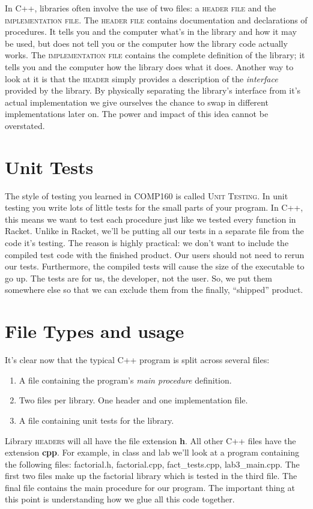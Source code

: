 \documentclass[]{tufte-handout}
\begin{document}
In C++, libraries often involve the use of two files: a \textsc{header file} and the \textsc{implementation file}. The \textsc{header file} contains documentation and declarations of procedures.  It tells you and the computer what's in the library and how it may be used, but does not tell you or the computer how the library code actually works.  The \textsc{implementation file} contains the complete definition of the library; it tells you and the computer how the library does what it does.  Another way to look at it is that the \textsc{header} simply provides a description of the \textit{interface} provided by the library.  By physically separating the library's interface from it's actual implementation we give ourselves the chance to swap in different implementations later on.  The power and impact of this idea cannot be overstated.  

\section{Unit Tests}

The style of testing you learned in COMP160 is called \textsc{Unit Testing}. In unit testing you write lots of little tests for the small parts of your program.  In C++, this means we want to test each procedure just like we tested every function in Racket.  Unlike in Racket, we'll be putting all our tests in a separate file from the code it's testing.  The reason is highly practical: we don't want to include the compiled test code with the finished product. Our users should not need to rerun our tests. Furthermore, the compiled tests will cause the size of the executable to go up.  The tests are for us, the developer, not the user. So, we put them somewhere else so that we can exclude them from the finally, ``shipped'' product. 

\section{File Types and usage}

It's clear now that the typical C++ program is split across several files:
\begin{enumerate}
\item A file containing the program's \textit{main procedure} definition.
\item Two files per library. One header and one implementation file.
\item A file containing unit tests for the library.
\end{enumerate}
Library \textsc{headers} will all have the file extension \textbf{h}. All other C++ files have the extension \textbf{cpp}.  For example, in class and lab we'll look at a program containing the following files: factorial.h, factorial.cpp, fact\_tests.cpp, lab3\_main.cpp.  The first two files make up the factorial library which is tested in the third file. The final file contains the main procedure for our program. The important thing at this point is understanding how we glue all this code together. 
\end{document}
